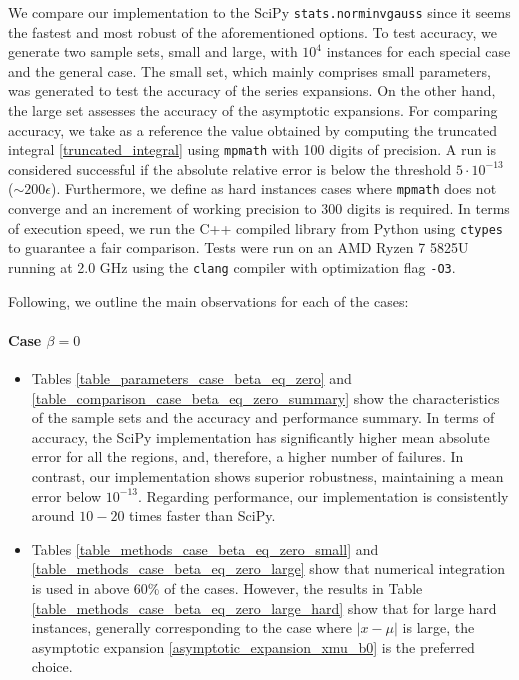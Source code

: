 \documentclass[10pt,a4paper,oneside]{article}
\numberwithin{equation}{section}
\begin{document}
We compare our implementation to the SciPy \texttt{stats.norminvgauss} since it seems the fastest and most robust of the aforementioned options. To test accuracy, we generate two sample sets, small and large, with $10^4$ instances for each special case and the general case. The small set, which mainly comprises small parameters, was generated to test the accuracy of the series expansions. On the other hand, the large set assesses the accuracy of the asymptotic expansions. For comparing accuracy, we take as a reference the value obtained by computing the truncated integral \eqref{truncated_integral} using \texttt{mpmath} with 100 digits of precision. A run is considered successful if the absolute relative error is below the threshold $5\cdot 10^{-13}$ ($\sim 200 \epsilon$).
Furthermore, we define as hard instances cases where \texttt{mpmath} does not converge and an increment of working precision to 300 digits is required.  
In terms of execution speed, we run the C++ compiled library from Python using \texttt{ctypes} to guarantee a fair comparison. Tests were run on an AMD Ryzen 7 5825U running at 2.0 GHz using the \texttt{clang} compiler with optimization flag \texttt{-O3}.

Following, we outline the main observations for each of the cases:

\paragraph{Case $\beta = 0$}
\begin{itemize}
\item Tables \ref{table_parameters_case_beta_eq_zero} and \ref{table_comparison_case_beta_eq_zero_summary} show the characteristics of the sample sets and the accuracy and performance summary. In terms of accuracy, the SciPy implementation has significantly higher mean absolute error for all the regions, and, therefore, a higher number of failures. In contrast, our implementation shows superior robustness, maintaining a mean error below $10^{-13}$. Regarding performance, our implementation is consistently around $10-20$ times faster than SciPy.
\item Tables \ref{table_methods_case_beta_eq_zero_small} and \ref{table_methods_case_beta_eq_zero_large} show that numerical integration is used in above 60\% of the cases. However, the results in Table \ref{table_methods_case_beta_eq_zero_large_hard} show that for large hard instances, generally corresponding to the case where $|x-\mu|$ is large, the asymptotic expansion \eqref{asymptotic_expansion_xmu_b0} is the preferred choice.
\end{itemize}
\end{document}
